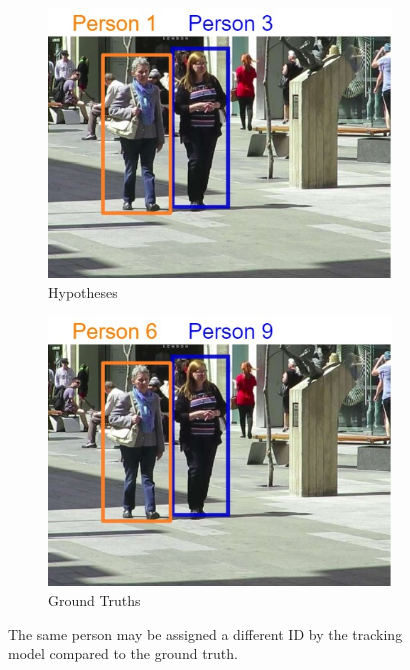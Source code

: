 \begin{figure}[H]
    \centering
    \begin{subfigure}[b]{0.48\textwidth}
        \centering
        \includegraphics[width=\linewidth]{figures/chapter_tracking/eval_hypo.jpg}
        \caption{Hypotheses}
        \label{fig:track_hypo} 
    \end{subfigure}
    \begin{subfigure}[b]{0.48\textwidth}
        \centering
        \includegraphics[width=\linewidth]{figures/chapter_tracking/eval_truth.jpg}
        \caption{Ground Truths}
        \label{fig:track_true}
    \end{subfigure}
  \caption{The same person may be assigned a different ID by the tracking model compared to the ground truth.}
  \label{fig:tracking_match}
\end{figure}

